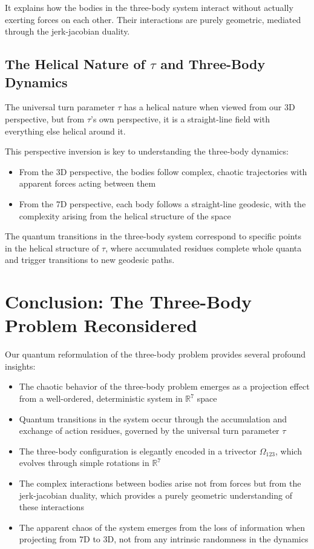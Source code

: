\documentclass{article}
\begin{document}
It explains how the bodies in the three-body system interact without actually exerting forces on each other. Their interactions are purely geometric, mediated through the jerk-jacobian duality.

\subsection{The Helical Nature of $\tau$ and Three-Body Dynamics}

The universal turn parameter $\tau$ has a helical nature when viewed from our 3D perspective, but from $\tau$'s own perspective, it is a straight-line field with everything else helical around it.

This perspective inversion is key to understanding the three-body dynamics:
\begin{itemize}
\item From the 3D perspective, the bodies follow complex, chaotic trajectories with apparent forces acting between them
\item From the 7D perspective, each body follows a straight-line geodesic, with the complexity arising from the helical structure of the space
\end{itemize}

The quantum transitions in the three-body system correspond to specific points in the helical structure of $\tau$, where accumulated residues complete whole quanta and trigger transitions to new geodesic paths.

\section{Conclusion: The Three-Body Problem Reconsidered}

Our quantum reformulation of the three-body problem provides several profound insights:

\begin{itemize}
\item The chaotic behavior of the three-body problem emerges as a projection effect from a well-ordered, deterministic system in $\mathbb{R}^7$ space
\item Quantum transitions in the system occur through the accumulation and exchange of action residues, governed by the universal turn parameter $\tau$
\item The three-body configuration is elegantly encoded in a trivector $\Omega_{123}$, which evolves through simple rotations in $\mathbb{R}^7$
\item The complex interactions between bodies arise not from forces but from the jerk-jacobian duality, which provides a purely geometric understanding of these interactions
\item The apparent chaos of the system emerges from the loss of information when projecting from 7D to 3D, not from any intrinsic randomness in the dynamics
\end{itemize}
\end{document}
